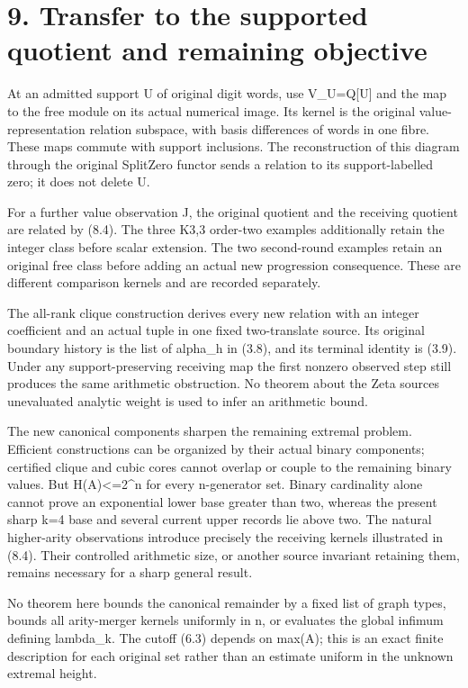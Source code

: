 \section{9. Transfer to the supported quotient and remaining objective}\label{n18-transfer-to-the-supported-quotient-and-remaining-objective}

At an admitted support U of original digit words, use V\_U=Q{[}U{]} and the map to the free module on its actual numerical image. Its kernel is the original value-representation relation subspace, with basis differences of words in one fibre. These maps commute with support inclusions. The reconstruction of this diagram through the original SplitZero functor sends a relation to its support-labelled zero; it does not delete U.

For a further value observation J, the original quotient and the receiving quotient are related by (8.4). The three K3,3 order-two examples additionally retain the integer class before scalar extension. The two second-round examples retain an original free class before adding an actual new progression consequence. These are different comparison kernels and are recorded separately.

The all-rank clique construction derives every new relation with an integer coefficient and an actual tuple in one fixed two-translate source. Its original boundary history is the list of alpha\_h in (3.8), and its terminal identity is (3.9). Under any support-preserving receiving map the first nonzero observed step still produces the same arithmetic obstruction. No theorem about the Zeta source\textquotesingle s unevaluated analytic weight is used to infer an arithmetic bound.

The new canonical components sharpen the remaining extremal problem. Efficient constructions can be organized by their actual binary components; certified clique and cubic cores cannot overlap or couple to the remaining binary values. But \textbar H(A)\textbar\textless=2\^{}n for every n-generator set. Binary cardinality alone cannot prove an exponential lower base greater than two, whereas the present sharp k=4 base and several current upper records lie above two. The natural higher-arity observations introduce precisely the receiving kernels illustrated in (8.4). Their controlled arithmetic size, or another source invariant retaining them, remains necessary for a sharp general result.

No theorem here bounds the canonical remainder by a fixed list of graph types, bounds all arity-merger kernels uniformly in n, or evaluates the global infimum defining lambda\_k. The cutoff (6.3) depends on max(A); this is an exact finite description for each original set rather than an estimate uniform in the unknown extremal height.

